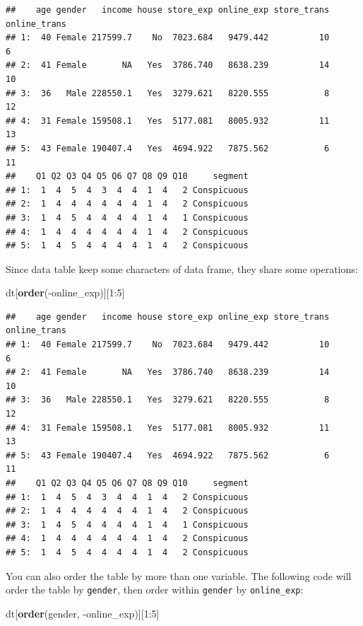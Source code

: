 \documentclass[]{book}
\newenvironment{Shaded}{\begin{snugshade}}{\end{snugshade}}
\newcommand{\KeywordTok}[1]{\textcolor[rgb]{0.13,0.29,0.53}{\textbf{{#1}}}}
\newcommand{\DecValTok}[1]{\textcolor[rgb]{0.00,0.00,0.81}{{#1}}}
\newcommand{\NormalTok}[1]{{#1}}
\theoremstyle{definition}
\theoremstyle{definition}
\theoremstyle{remark}
\begin{document}
\begin{verbatim}
##    age gender   income house store_exp online_exp store_trans online_trans
## 1:  40 Female 217599.7    No  7023.684   9479.442          10            6
## 2:  41 Female       NA   Yes  3786.740   8638.239          14           10
## 3:  36   Male 228550.1   Yes  3279.621   8220.555           8           12
## 4:  31 Female 159508.1   Yes  5177.081   8005.932          11           13
## 5:  43 Female 190407.4   Yes  4694.922   7875.562           6           11
##    Q1 Q2 Q3 Q4 Q5 Q6 Q7 Q8 Q9 Q10     segment
## 1:  1  4  5  4  3  4  4  1  4   2 Conspicuous
## 2:  1  4  4  4  4  4  4  1  4   2 Conspicuous
## 3:  1  4  5  4  4  4  4  1  4   1 Conspicuous
## 4:  1  4  4  4  4  4  4  1  4   2 Conspicuous
## 5:  1  4  5  4  4  4  4  1  4   2 Conspicuous
\end{verbatim}

Since data table keep some characters of data frame, they share some
operations:

\begin{Shaded}
\begin{Highlighting}[]
\NormalTok{dt[}\KeywordTok{order}\NormalTok{(-online_exp)][}\DecValTok{1}\NormalTok{:}\DecValTok{5}\NormalTok{]}
\end{Highlighting}
\end{Shaded}

\begin{verbatim}
##    age gender   income house store_exp online_exp store_trans online_trans
## 1:  40 Female 217599.7    No  7023.684   9479.442          10            6
## 2:  41 Female       NA   Yes  3786.740   8638.239          14           10
## 3:  36   Male 228550.1   Yes  3279.621   8220.555           8           12
## 4:  31 Female 159508.1   Yes  5177.081   8005.932          11           13
## 5:  43 Female 190407.4   Yes  4694.922   7875.562           6           11
##    Q1 Q2 Q3 Q4 Q5 Q6 Q7 Q8 Q9 Q10     segment
## 1:  1  4  5  4  3  4  4  1  4   2 Conspicuous
## 2:  1  4  4  4  4  4  4  1  4   2 Conspicuous
## 3:  1  4  5  4  4  4  4  1  4   1 Conspicuous
## 4:  1  4  4  4  4  4  4  1  4   2 Conspicuous
## 5:  1  4  5  4  4  4  4  1  4   2 Conspicuous
\end{verbatim}

You can also order the table by more than one variable. The following
code will order the table by \texttt{gender}, then order within
\texttt{gender} by \texttt{online\_exp}:

\begin{Shaded}
\begin{Highlighting}[]
\NormalTok{dt[}\KeywordTok{order}\NormalTok{(gender, -online_exp)][}\DecValTok{1}\NormalTok{:}\DecValTok{5}\NormalTok{]}
\end{Highlighting}
\end{Shaded}
\end{document}
